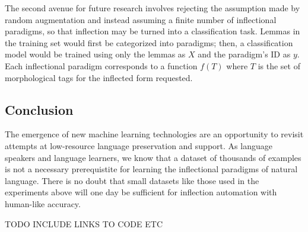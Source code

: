 \documentclass{article}
\begin{document}
      The second avenue for future research involves rejecting the assumption made by random augmentation and instead assuming a finite number of inflectional paradigms, so that inflection may be turned into a classification task. Lemmas in the training set would first be categorized into paradigms; then, a classification model would be trained using only the lemmas as $X$ and the paradigm's ID as $y$. Each inflectional paradigm corresponds to a function $f(T)$ where $T$ is the set of morphological tags for the inflected form requested.

    \subsection{Conclusion}
      The emergence of new machine learning technologies are an opportunity to revisit attempts at low-resource language preservation and support. As language speakers and language learners, we know that a dataset of thousands of examples is not a necessary prerequistite for learning the inflectional paradigms of natural language. There is no doubt that small datasets like those used in the experiments above will one day be sufficient for inflection automation with human-like accuracy. 

      TODO INCLUDE LINKS TO CODE ETC
  
\end{document}
